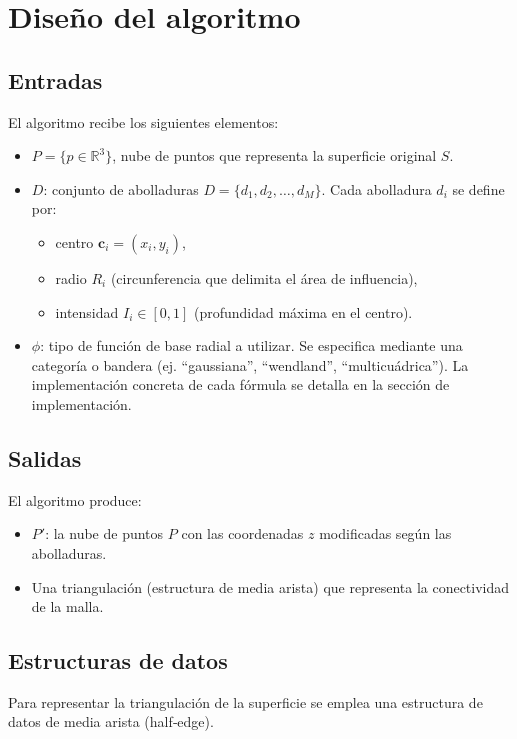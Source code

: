 \documentclass[12pt, letterpaper]{article}
\begin{document}
\section{Diseño del algoritmo}

\subsection{Entradas}
El algoritmo recibe los siguientes elementos:
\begin{itemize}
    \item \(P = \{p \in \mathbb{R}^3\}\), nube de puntos que representa la superficie original \(S\).
    \item \(D\): conjunto de abolladuras \(D = \{d_1, d_2, \dots, d_M\}\). Cada abolladura \(d_i\) se define por:
        \begin{itemize}
            \item centro \(\mathbf{c}_i = (x_i, y_i)\),
            \item radio \(R_i\) (circunferencia que delimita el área de influencia),
            \item intensidad \(I_i \in [0,1]\) (profundidad máxima en el centro).
        \end{itemize}
    \item \(\phi\): tipo de función de base radial a utilizar. Se especifica mediante una categoría o bandera (ej. ``gaussiana'', ``wendland'', ``multicuádrica''). La implementación concreta de cada fórmula se detalla en la sección de implementación.
\end{itemize}

\subsection{Salidas}
El algoritmo produce:
\begin{itemize}
    \item \(P'\): la nube de puntos \(P\) con las coordenadas \(z\) modificadas según las abolladuras.
    \item Una triangulación (estructura de media arista) que representa la conectividad de la malla.
\end{itemize}

\subsection{Estructuras de datos}
Para representar la triangulación de la superficie se emplea una estructura de datos de media arista (half‑edge).
\end{document}
